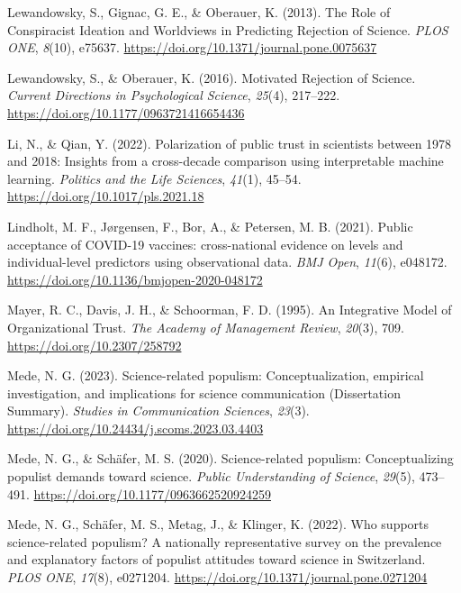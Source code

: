 \documentclass[
  doc,floatsintext]{apa6}
\newlength{\cslhangindent}
\newenvironment{CSLReferences}[2] %
 {\begin{list}{}{%
  \setlength{\itemindent}{0pt}
  \setlength{\leftmargin}{0pt}
  \setlength{\parsep}{0pt}
  \ifodd #1
   \setlength{\leftmargin}{\cslhangindent}
   \setlength{\itemindent}{-1\cslhangindent}
  \fi
  \setlength{\itemsep}{#2\baselineskip}}}
 {\end{list}}
\begin{document}
\begin{CSLReferences}{1}{0}
Lewandowsky, S., Gignac, G. E., \& Oberauer, K. (2013). The Role of Conspiracist Ideation and Worldviews in Predicting Rejection of Science. \emph{PLOS ONE}, \emph{8}(10), e75637. \url{https://doi.org/10.1371/journal.pone.0075637}

Lewandowsky, S., \& Oberauer, K. (2016). Motivated Rejection of Science. \emph{Current Directions in Psychological Science}, \emph{25}(4), 217--222. \url{https://doi.org/10.1177/0963721416654436}

Li, N., \& Qian, Y. (2022). Polarization of public trust in scientists between 1978 and 2018: Insights from a cross-decade comparison using interpretable machine learning. \emph{Politics and the Life Sciences}, \emph{41}(1), 45--54. \url{https://doi.org/10.1017/pls.2021.18}

Lindholt, M. F., Jørgensen, F., Bor, A., \& Petersen, M. B. (2021). Public acceptance of COVID-19 vaccines: cross-national evidence on levels and individual-level predictors using observational data. \emph{BMJ Open}, \emph{11}(6), e048172. \url{https://doi.org/10.1136/bmjopen-2020-048172}

Mayer, R. C., Davis, J. H., \& Schoorman, F. D. (1995). An Integrative Model of Organizational Trust. \emph{The Academy of Management Review}, \emph{20}(3), 709. \url{https://doi.org/10.2307/258792}

Mede, N. G. (2023). Science-related populism: Conceptualization, empirical investigation, and implications for science communication (Dissertation Summary). \emph{Studies in Communication Sciences}, \emph{23}(3). \url{https://doi.org/10.24434/j.scoms.2023.03.4403}

Mede, N. G., \& Schäfer, M. S. (2020). Science-related populism: Conceptualizing populist demands toward science. \emph{Public Understanding of Science}, \emph{29}(5), 473--491. \url{https://doi.org/10.1177/0963662520924259}

Mede, N. G., Schäfer, M. S., Metag, J., \& Klinger, K. (2022). Who supports science-related populism? A nationally representative survey on the prevalence and explanatory factors of populist attitudes toward science in Switzerland. \emph{PLOS ONE}, \emph{17}(8), e0271204. \url{https://doi.org/10.1371/journal.pone.0271204}


\end{CSLReferences}
\end{document}
